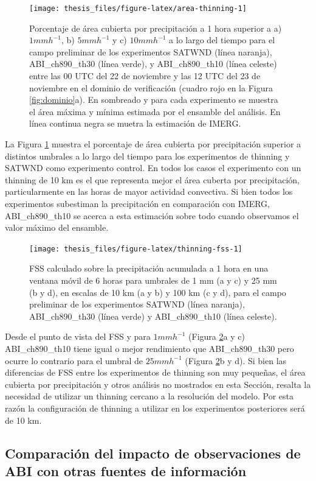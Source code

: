 \documentclass[12pt,oneside,a4paper]{reedthesis}
\begin{document}
\begin{figure}
\texttt{[image: thesis\_files/figure-latex/area-thinning-1]} \caption{Porcentaje de área cubierta por precipitación a 1 hora superior a a) \(1 mmh^{-1}\), b) \(5 mmh^{-1}\) y c) \(10 mmh^{-1}\) a lo largo del tiempo para el campo preliminar de los experimentos SATWND (línea naranja), ABI\_ch890\_th30 (línea verde), y ABI\_ch890\_th10 (línea celeste) entre las 00 UTC del 22 de noviembre y las 12 UTC del 23 de noviembre en el dominio de verificación (cuadro rojo en la Figura \ref{fig:dominio}a). En sombreado y para cada experimento se muestra el área máxima y mínima estimada por el ensamble del análisis. En línea continua negra se muetra la estimación de IMERG.}\label{fig:area-thinning}
\end{figure}
La Figura \ref{fig:area-thinning} muestra el porcentaje de área cubierta por precipitación superior a distintos umbrales a lo largo del tiempo para los experimentos de thinning y SATWND como experimento control. En todos los casos el experimento con un thinning de 10 km es el que representa mejor el área cuberta por precipitación, particularmente en las horas de mayor actividad convectiva. Si bien todos los experimentos subestiman la precipitación en comparación con IMERG, ABI\_ch890\_th10 se acerca a esta estimación sobre todo cuando observamos el valor máximo del ensamble.


\begin{figure}
\texttt{[image: thesis\_files/figure-latex/thinning-fss-1]} \caption{FSS calculado sobre la precipitación acumulada a 1 hora en una ventana móvil de 6 horas para umbrales de 1 mm (a y c) y 25 mm (b y d), en escalas de 10 km (a y b) y 100 km (c y d), para el campo preliminar de los experimentos SATWND (línea naranja), ABI\_ch890\_th30 (línea verde) y ABI\_ch890\_th10 (línea celeste).}\label{fig:thinning-fss}
\end{figure}
Desde el punto de vista del FSS y para \(1 mm h^{-1}\) (Figura \ref{fig:thinning-fss}a y c) ABI\_ch890\_th10 tiene igual o mejor rendimiento que ABI\_ch890\_th30 pero ocurre lo contrario para el umbral de \(25 mm h^{-1}\) (Figura \ref{fig:thinning-fss}b y d). Si bien las diferencias de FSS entre los experimentos de thinning son muy pequeñas, el área cubierta por precipitación y otros análisis no mostrados en esta Sección, resalta la necesidad de utilizar un thinning cercano a la resolución del modelo. Por esta razón la configuración de thinning a utilizar en los experimentos posteriores será de 10 km.

\hypertarget{comparaciuxf3n-del-impacto-de-observaciones-de-abi-con-otras-fuentes-de-informaciuxf3n}{%
\subsection{Comparación del impacto de observaciones de ABI con otras fuentes de información}\label{comparaciuxf3n-del-impacto-de-observaciones-de-abi-con-otras-fuentes-de-informaciuxf3n}}
\end{document}
